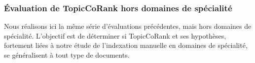       \subsubsection{Évaluation de TopicCoRank hors domaines de spécialité}
      \label{subsubsec:main-domain_specific_keyphrase_annotation-supervised_automatic_keyphrase_annotation-evaluation-topiccorank_indepent_domains}
        Nous réalisons ici la même série d'évaluations précédentes, mais hors
        domaines de spécialité. L'objectif est de déterminer si TopicCoRank et
        ses hypothèses, fortement liées à notre étude de l'indexation manuelle
        en domaines de spécialité, se généralisent à tout type de documents.

